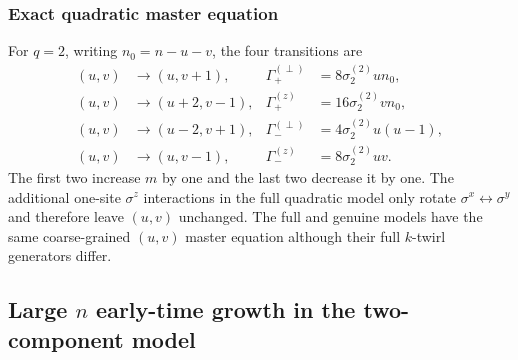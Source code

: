 \documentclass{article}
\theoremstyle{definition}
\begin{document}
\subsubsection{Exact quadratic master equation}

For $q=2$, writing $n_0=n-u-v$, the four transitions are
\begin{align}
    (u,v)&\longrightarrow(u,v+1),
    &\Gamma_+^{(\perp)}&=8\sigma_2^{(2)}un_0,
    \\
    (u,v)&\longrightarrow(u+2,v-1),
    &\Gamma_+^{(z)}&=16\sigma_2^{(2)}vn_0,
    \\
    (u,v)&\longrightarrow(u-2,v+1),
    &\Gamma_-^{(\perp)}&=4\sigma_2^{(2)}u(u-1),
    \\
    (u,v)&\longrightarrow(u,v-1),
    &\Gamma_-^{(z)}&=8\sigma_2^{(2)}uv.
\end{align}
The first two increase $m$ by one and the last two decrease it by one.  The
additional one-site $\sigma^z$ interactions in the full quadratic model
only rotate $\sigma^x\leftrightarrow\sigma^y$ and therefore leave $(u,v)$
unchanged.  The full and genuine models have the same coarse-grained
$(u,v)$ master equation although their full $k$-twirl generators differ.

\subsection{Large $n$ early-time growth in the two-component model}
\end{document}
